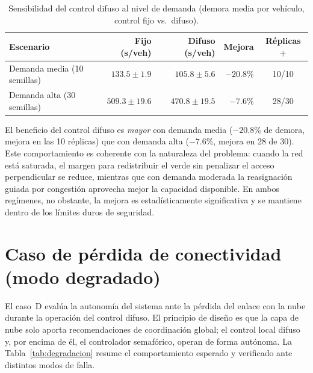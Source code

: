 \begin{table}[H]
  \centering
  \footnotesize
  \caption{Sensibilidad del control difuso al nivel de demanda (demora media por vehículo, control fijo vs.\ difuso).}
  \label{tab:sensibilidad-demanda}
  \begin{tabularx}{\linewidth}{@{}X r r r c@{}}
    \toprule
    \textbf{Escenario} & \textbf{Fijo (s/veh)} & \textbf{Difuso (s/veh)} & \textbf{Mejora} & \textbf{Réplicas $+$}\\
    \midrule
    Demanda media (10 semillas) & $133.5 \pm 1.9$  & $105.8 \pm 5.6$  & $-20.8\%$ & 10/10\\
    Demanda alta (30 semillas)  & $509.3 \pm 19.6$ & $470.8 \pm 19.5$ & $-7.6\%$  & 28/30\\
    \bottomrule
  \end{tabularx}
\end{table}

El beneficio del control difuso es \emph{mayor} con demanda media ($-20.8\%$ de demora, mejora en las 10
réplicas) que con demanda alta ($-7.6\%$, mejora en 28 de 30). Este comportamiento es coherente con la
naturaleza del problema: cuando la red está saturada, el margen para redistribuir el verde sin penalizar el
acceso perpendicular se reduce, mientras que con demanda moderada la reasignación guiada por congestión
aprovecha mejor la capacidad disponible. En ambos regímenes, no obstante, la mejora es estadísticamente
significativa y se mantiene dentro de los límites duros de seguridad.

\section{Caso de pérdida de conectividad (modo degradado)}\label{sec:modo-degradado}

El caso~D evalúa la autonomía del sistema ante la pérdida del enlace con la nube durante la
operación del control difuso. El principio de diseño es que la capa de nube solo aporta
recomendaciones de coordinación global; el control local difuso y, por encima de él, el
controlador semafórico, operan de forma autónoma. La Tabla~\ref{tab:degradacion} resume el
comportamiento esperado y verificado ante distintos modos de falla.

